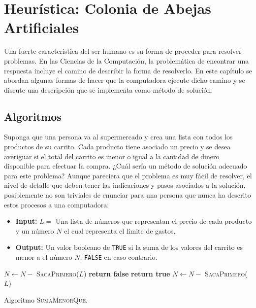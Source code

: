 \chapter{Heurística: Colonia de Abejas Artificiales}

Una fuerte característica del ser humano es su forma de proceder 
para resolver problemas. En las Ciencias de la Computación, 
la problemática de encontrar una respuesta incluye el camino de 
describir la forma de resolverlo. En este capítulo se abordan algunas formas de 
hacer que la computadora ejecute dicho camino y se discute una descripción 
que se implementa como método de solución.

\section{Algoritmos}

Suponga que una persona va al supermercado y crea una lista con todos los
productos de su carrito. Cada producto tiene asociado un precio y se desea
averiguar si el total del carrito es menor o igual a la cantidad de dinero
disponible para efectuar la compra. ¿Cuál sería un método de solución
adecuado para este problema? Aunque pareciera que el problema es muy fácil
de resolver, el nivel de detalle que deben tener las indicaciones y pasos asociados a
la solución, posiblemente no son triviales de enunciar para una persona que nunca
ha descrito estos procesos a una computadora:

\begin{itemize}

\item \textbf{Input:} $L = $ Una lista de números que representan el precio de
  cada producto y un número $N$ el cual representa el límite de gastos.

\item \textbf{Output:} Un valor booleano de \texttt{TRUE} si la suma de los
  valores del carrito es menor a el número $N$, \texttt{FALSE} en caso
  contrario.

\end{itemize}

\begin{algorithm}
  \begin{algorithmic}[1]
      \State $N \leftarrow N -$ \textsc{SacaPrimero}($L$)
          \State \textbf{return false}
        \EndIf
          \State \textbf{return true}
        \EndIf
        \State $N \leftarrow N -$ \textsc{SacaPrimero}($L$)
      \EndWhile
    \EndProcedure
  \end{algorithmic}
  \caption{Algoritmo \textsc{SumaMenorQue}.}
  \label{code:algoritmo}
\end{algorithm}

